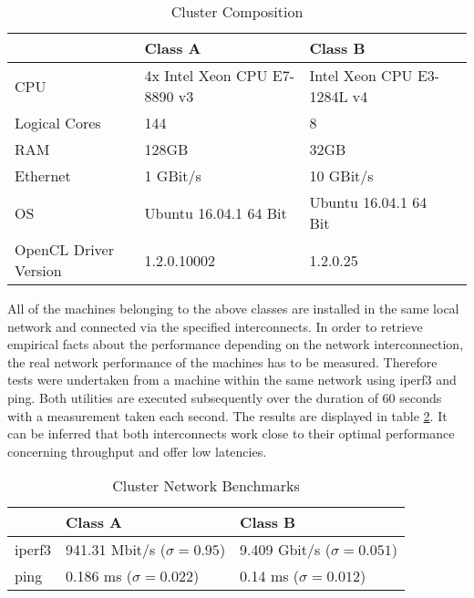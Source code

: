 \begin{table}[htb]
	\centering
	\begin{adjustbox}{width=0.7\textwidth}
		\small
		\begin{tabular}{l | l | l | l}
			~                     & Class A                  	& Class B                  \\
			\hline
			CPU                   &  4x Intel Xeon CPU E7-8890 v3 	& Intel Xeon CPU E3-1284L v4 \\
			Logical Cores         &  144 	& 8 \\
			RAM                   &  128GB                       	& 32GB                       \\
			Ethernet	          &  1 GBit/s                  	& 10 GBit/s                  \\
			OS                    &  Ubuntu 16.04.1 64 Bit      	& Ubuntu 16.04.1 64 Bit      \\
			OpenCL Driver Version &  1.2.0.10002                   & 1.2.0.25                   \\
		\end{tabular}
	\end{adjustbox}
	
	\caption{Cluster Composition}
	\label{table:cluster_setup_1}
\end{table}

All of the machines belonging to the above classes are installed in the same local network and connected via the specified interconnects. In order to retrieve empirical facts about the performance depending on the network interconnection, the real network performance of the machines has to be measured. Therefore tests were undertaken from a machine within the same network using iperf3 and ping. Both utilities are executed subsequently over the duration of 60 seconds with a measurement taken each second. The results are displayed in table \ref{table:cluster_interconnect_benchmarks}. It can be inferred that both interconnects work close to their optimal performance concerning throughput and offer low latencies.

\begin{table}[!htb]
	\centering
	\begin{adjustbox}{width=0.5\textwidth}
		\small
		\begin{tabular}{l | l | l}
			~                     & Class A                 			& Class B                  \\
			\hline
			iperf3                & 941.31 Mbit/s ($\sigma = 0.95$) 	& 9.409 Gbit/s ($\sigma = 0.051$) \\
			ping                  & 0.186 ms ($\sigma = 0.022$)  		& 0.14 ms ($\sigma = 0.012$)  \\
		\end{tabular}
	\end{adjustbox}
	
	\caption{Cluster Network Benchmarks}
	\label{table:cluster_interconnect_benchmarks}
\end{table}

